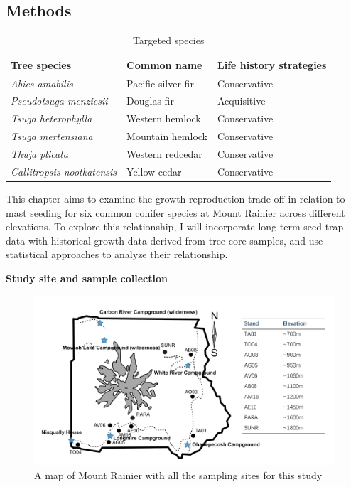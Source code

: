 \documentclass[11pt,letter]{article}
\begin{document}
\subsection{Methods}
\begin{table}[htb]
	\centering
	\small
	\caption{Targeted species}
\begin{tabular}{|p{5cm}|p{5cm}|p{5cm}|}
\hline
 Tree species & Common name & Life history strategies\\ \hline %
\textit{Abies amabilis} & Pacific silver fir & Conservative \\ \hline
\textit{Pseudotsuga menziesii} & Douglas fir & Acquisitive    \\\hline
\textit{Tsuga heterophylla} & Western hemlock & Conservative    \\\hline
\textit{Tsuga mertensiana} & Mountain hemlock & Conservative    \\\hline
\textit{Thuja plicata} & Western redcedar & Conservative    \\\hline
\textit{Callitropsis nootkatensis} & Yellow cedar & Conservative    \\\hline
\end{tabular}
\end{table}
This chapter aims to examine the growth-reproduction trade-off in relation to mast seeding for six common conifer species at Mount Rainier across different elevations. To explore this relationship, I will incorporate long-term seed trap data with historical growth data derived from tree core samples, and use statistical approaches to analyze their relationship.\par
\textbf{Study site and sample collection}\\
\begin{figure}[htb]
	\centering
	\includegraphics[width=1\linewidth]{rainierMap.png}
	\caption{A map of Mount Rainier with all the sampling sites for this study}
	\label{fig:sites}
\end{figure}\\
\end{document}
